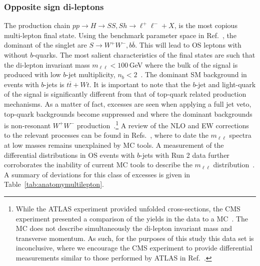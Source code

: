 \documentclass[10pt]{article}
\begin{document}
\subsubsection{Opposite sign di-leptons}
\label{sec:OS}
%
The production chain $pp\rightarrow H\rightarrow SS,Sh\rightarrow\ell^+\ell^-+X$,  is the most copious multi-lepton final state. Using the benchmark parameter space in Ref.~\cite{vonBuddenbrock:2018xar}, the dominant of the singlet are $S\rightarrow W^+W^-,b\overline{b}$. This will lead to OS leptons with without $b$-quarks. The most salient characteristics of the final states are such that the di-lepton invariant mass $m_{\ell\ell}<100$\,GeV where the bulk of the signal is produced with low $b$-jet multiplicity, $n_b<2$~\cite{vonBuddenbrock:2019ajh}. The dominant SM background in events with $b$-jets is $t\overline{t}+Wt$. It is important to note that the $b$-jet and light-quark of the signal is significantly different from that of top-quark related production mechanisms. As a matter of fact, excesses are seen when applying a full jet veto, top-quark backgrounds become suppressed and where the dominant backgrounds is non-resonant $W^+W^-$ production~\cite{vonBuddenbrock:2017gvy,ATLAS:2019rob,vonBuddenbrock:2019daj}.\footnote{While the ATLAS experiment provided unfolded cross-sections, the CMS experiment presented a comparison of the yields in the data to a MC~\cite{CMS:2020mxy}. The MC does not describe simultaneously the di-lepton invariant mass and transverse momentum. As such, for the purposes of this study this data set is inconclusive, where we encourage the CMS experiment to provide differential measurements similar to those performed by ATLAS in Ref.~\cite{ATLAS:2019rob}.} A review of the NLO and EW corrections to the relevant processes can be found in Refs.~\cite{vonBuddenbrock:2019ajh,vonBuddenbrock:2019daj}, where to date the $m_{\ell\ell}$ spectra at low masses remains unexplained by MC tools. A measurement of the differential distributions in OS events with $b$-jets with Run 2 data further corroborates the inability of current MC tools to describe the $m_{\ell\ell}$ distribution~\cite{ATLAS:2019hau}. A summary of  deviations for this class of excesses is given in Table~\ref{tab:anatomymultilepton}.
\end{document}

